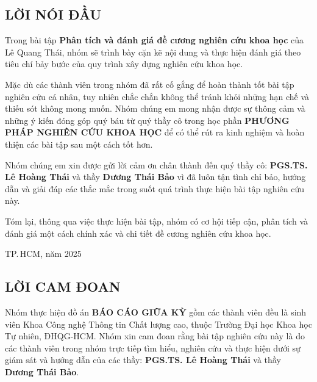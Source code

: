 \begin{center}
    \section*{LỜI NÓI ĐẦU}
\end{center}

Trong bài tập \textbf{Phân tích và đánh giá đề cương nghiên cứu khoa học} của Lê Quang Thái, nhóm sẽ trình bày cặn kẽ nội dung và thực hiện đánh giá theo tiêu chí bảy bước của quy trình xây dựng nghiên cứu khoa học.

Mặc dù các thành viên trong nhóm đã rất cố gắng để hoàn thành tốt bài tập nghiên cứu cá nhân, tuy nhiên chắc chắn không thể tránh khỏi những hạn chế và thiếu sót không mong muốn. Nhóm chúng em mong nhận được sự thông cảm và những ý kiến đóng góp quý báu từ quý thầy cô trong học phần \textbf{PHƯƠNG PHÁP NGHIÊN CỨU KHOA HỌC} để có thể rút ra kinh nghiệm và hoàn thiện các bài tập sau một cách tốt hơn.

Nhóm chúng em xin được gửi lời cảm ơn chân thành đến quý thầy cô: \textbf{PGS.TS. Lê Hoàng Thái} và thầy \textbf{Dương Thái Bảo} vì đã luôn tận tình chỉ bảo, hướng dẫn và giải đáp các thắc mắc trong suốt quá trình thực hiện bài tập nghiên cứu này.

Tóm lại, thông qua việc thực hiện bài tập, nhóm có cơ hội tiếp cận, phân tích và đánh giá một cách chính xác và chi tiết đề cương nghiên cứu khoa học.

\vspace{1cm}
\begin{flushright}
\begin{minipage}{0.4\textwidth}
\centering
TP.\,HCM, năm 2025
\end{minipage}
\end{flushright}

\newpage

\begin{center}
    \section*{LỜI CAM ĐOAN}
\end{center}

Nhóm thực hiện đồ án \textbf{BÁO CÁO GIỮA KỲ} gồm các thành viên đều là sinh viên Khoa Công nghệ Thông tin Chất lượng cao, thuộc Trường Đại học Khoa học Tự nhiên, ĐHQG-HCM. Nhóm xin cam đoan rằng bài tập nghiên cứu này là do các thành viên trong nhóm trực tiếp tìm hiểu, nghiên cứu và thực hiện dưới sự giám sát và hướng dẫn của các thầy: \textbf{PGS.TS. Lê Hoàng Thái} và thầy \textbf{Dương Thái Bảo}.

